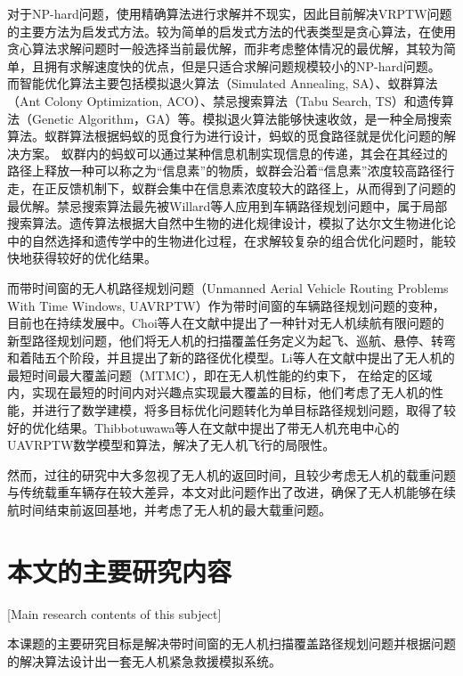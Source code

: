 对于NP-hard问题，使用精确算法进行求解并不现实，因此目前解决VRPTW问题的主要方法为启发式方法。较为简单的启发式方法的代表类型是贪心算法，在使用贪心算法求解问题时一般选择当前最优解，而非考虑整体情况的最优解，其较为简单，且拥有求解速度快的优点，但是只适合求解问题规模较小的NP-hard问题。
而智能优化算法主要包括模拟退火算法（Simulated Annealing, SA）、蚁群算法（Ant Colony Optimization, ACO）、禁忌搜索算法（Tabu Search, TS）和遗传算法（Genetic Algorithm，GA）等。模拟退火算法能够快速收敛，是一种全局搜索算法\cite{lee2021simulated}。蚁群算法根据蚂蚁的觅食行为进行设计，蚂蚁的觅食路径就是优化问题的解决方案。
蚁群内的蚂蚁可以通过某种信息机制实现信息的传递，其会在其经过的路径上释放一种可以称之为“信息素”的物质，蚁群会沿着“信息素”浓度较高路径行走，在正反馈机制下，蚁群会集中在信息素浓度较大的路径上，从而得到了问题的最优解\cite{wu2021hybrid}。禁忌搜索算法最先被Willard等人应用到车辆路径规划问题中\cite{ilhan2021improved}，属于局部搜索算法。遗传算法根据大自然中生物的进化规律设计，模拟了达尔文生物进化论中的自然选择和遗传学中的生物进化过程，在求解较复杂的组合优化问题时，能较快地获得较好的优化结果。


而带时间窗的无人机路径规划问题（Unmanned Aerial Vehicle Routing Problems With Time Windows, UAVRPTW）作为带时间窗的车辆路径规划问题的变种，目前也在持续发展中。Choi等人在文献中提出了一种针对无人机续航有限问题的新型路径规划问题，他们将无人机的扫描覆盖任务定义为起飞、巡航、悬停、转弯和着陆五个阶段，并且提出了新的路径优化模型\cite{2019Energy}。Li等人在文献中提出了无人机的最短时间最大覆盖问题（MTMC），即在无人机性能的约束下，
在给定的区域内，实现在最短的时间内对兴趣点实现最大覆盖的目标，他们考虑了无人机的性能，并进行了数学建模，将多目标优化问题转化为单目标路径规划问题，取得了较好的优化结果\cite{2020A}。Thibbotuwawa等人在文献中提出了带无人机充电中心的UAVRPTW数学模型和算法，解决了无人机飞行的局限性\cite{thibbotuwawa2020unmanned}。


然而，过往的研究中大多忽视了无人机的返回时间，且较少考虑无人机的载重问题与传统载重车辆存在较大差异，本文对此问题作出了改进，确保了无人机能够在续航时间结束前返回基地，并考虑了无人机的最大载重问题。
\section{本文的主要研究内容}[Main research contents of this subject]

本课题的主要研究目标是解决带时间窗的无人机扫描覆盖路径规划问题并根据问题的解决算法设计出一套无人机紧急救援模拟系统。

